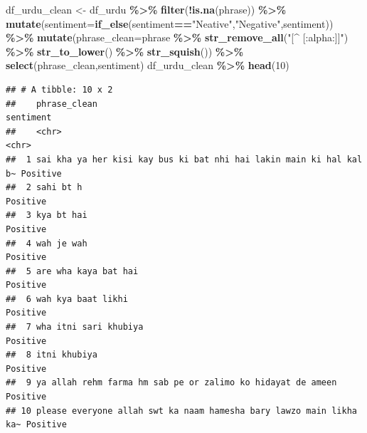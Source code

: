 \documentclass[
]{article}
\newenvironment{Shaded}{\begin{snugshade}}{\end{snugshade}}
\newcommand{\DataTypeTok}[1]{\textcolor[rgb]{0.13,0.29,0.53}{#1}}
\newcommand{\DecValTok}[1]{\textcolor[rgb]{0.00,0.00,0.81}{#1}}
\newcommand{\KeywordTok}[1]{\textcolor[rgb]{0.13,0.29,0.53}{\textbf{#1}}}
\newcommand{\NormalTok}[1]{#1}
\newcommand{\OperatorTok}[1]{\textcolor[rgb]{0.81,0.36,0.00}{\textbf{#1}}}
\newcommand{\StringTok}[1]{\textcolor[rgb]{0.31,0.60,0.02}{#1}}
\begin{document}
\begin{Shaded}
\begin{Highlighting}[]
\NormalTok{df\_urdu\_clean \textless{}{-}}\StringTok{ }\NormalTok{df\_urdu }\OperatorTok{\%\textgreater{}\%}
\StringTok{  }\KeywordTok{filter}\NormalTok{(}\OperatorTok{!}\KeywordTok{is.na}\NormalTok{(phrase)) }\OperatorTok{\%\textgreater{}\%}
\StringTok{  }\KeywordTok{mutate}\NormalTok{(}\DataTypeTok{sentiment=}\KeywordTok{if\_else}\NormalTok{(sentiment}\OperatorTok{==}\StringTok{"Neative"}\NormalTok{,}\StringTok{"Negative"}\NormalTok{,sentiment)) }\OperatorTok{\%\textgreater{}\%}
\StringTok{  }\KeywordTok{mutate}\NormalTok{(}\DataTypeTok{phrase\_clean=}\NormalTok{phrase }\OperatorTok{\%\textgreater{}\%}
\StringTok{           }\KeywordTok{str\_remove\_all}\NormalTok{(}\StringTok{"[\^{} [:alpha:]]"}\NormalTok{) }\OperatorTok{\%\textgreater{}\%}
\StringTok{           }\KeywordTok{str\_to\_lower}\NormalTok{() }\OperatorTok{\%\textgreater{}\%}
\StringTok{           }\KeywordTok{str\_squish}\NormalTok{()) }\OperatorTok{\%\textgreater{}\%}
\StringTok{  }\KeywordTok{select}\NormalTok{(phrase\_clean,sentiment)}
\NormalTok{df\_urdu\_clean }\OperatorTok{\%\textgreater{}\%}\StringTok{ }\KeywordTok{head}\NormalTok{(}\DecValTok{10}\NormalTok{)}
\end{Highlighting}
\end{Shaded}

\begin{verbatim}
## # A tibble: 10 x 2
##    phrase_clean                                                        sentiment
##    <chr>                                                               <chr>    
##  1 sai kha ya her kisi kay bus ki bat nhi hai lakin main ki hal kal b~ Positive 
##  2 sahi bt h                                                           Positive 
##  3 kya bt hai                                                          Positive 
##  4 wah je wah                                                          Positive 
##  5 are wha kaya bat hai                                                Positive 
##  6 wah kya baat likhi                                                  Positive 
##  7 wha itni sari khubiya                                               Positive 
##  8 itni khubiya                                                        Positive 
##  9 ya allah rehm farma hm sab pe or zalimo ko hidayat de ameen         Positive 
## 10 please everyone allah swt ka naam hamesha bary lawzo main likha ka~ Positive
\end{verbatim}
\end{document}
